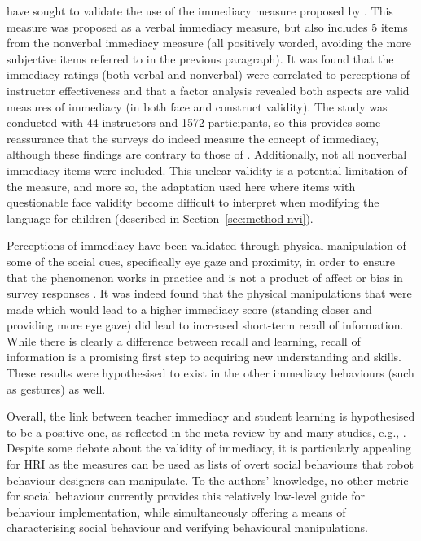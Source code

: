 \citet{wilson2007immediacy} have sought to validate the use of the immediacy measure proposed by \citet{gorham1988relationship}. This measure was proposed as a verbal immediacy measure, but also includes 5 items from the nonverbal immediacy measure (all positively worded, avoiding the more subjective items referred to in the previous paragraph). It was found that the immediacy ratings (both verbal and nonverbal) were correlated to perceptions of instructor effectiveness and that a factor analysis revealed both aspects are valid measures of immediacy (in both face and construct validity). The study was conducted with 44 instructors and 1572 participants, so this provides some reassurance that the surveys do indeed measure the concept of immediacy, although these findings are contrary to those of \citet{robinson1995validity}. Additionally, not all nonverbal immediacy items were included. This unclear validity is a potential limitation of the measure, and more so, the adaptation used here where items with questionable face validity become difficult to interpret when modifying the language for children (described in Section~\ref{sec:method-nvi}).

Perceptions of immediacy have been validated through physical manipulation of some of the social cues, specifically eye gaze and proximity, in order to ensure that the phenomenon works in practice and is not a product of affect or bias in survey responses \citep{kelley1988effects}. It was indeed found that the physical manipulations that were made which would lead to a higher immediacy score (standing closer and providing more eye gaze) did lead to increased short-term recall of information. While there is clearly a difference between recall and learning, recall of information is a promising first step to acquiring new understanding and skills. These results were hypothesised to exist in the other immediacy behaviours (such as gestures) as well.

Overall, the link between teacher immediacy and student learning is hypothesised to be a positive one, as reflected in the meta review by \cite{witt2004meta} and many studies, e.g., \citet{christensen1998linear,comstock1995food,mccroskey1996nonverbal}. Despite some debate about the validity of immediacy, it is particularly appealing for HRI as the measures can be used as lists of overt social behaviours that robot behaviour designers can manipulate. To the authors' knowledge, no other metric for social behaviour currently provides this relatively low-level guide for behaviour implementation, while simultaneously offering a means of characterising social behaviour and verifying behavioural manipulations.


